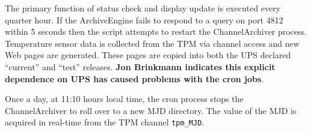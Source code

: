 The primary function of status
check and display update is executed every quarter hour.
If the ArchiveEngine fails to respond to a query on port 4812
within 5 seconds then the script attempts to restart the 
ChannelArchiver process. Temperature sensor data is collected
from the TPM via channel access and new Web pages are generated.
These pages are copied into both the UPS declared ``current''
and ``test'' releases. {\bf Jon Brinkmann indicates this
explicit dependence on UPS has caused problems with the 
cron jobs}.

Once a day, at 11:10 hours local time, the cron process stops
the ChannelArchiver to roll over to a new MJD directory. The
value of the MJD is acquired in real-time from the TPM
channel {\tt tpm\_MJD}.
